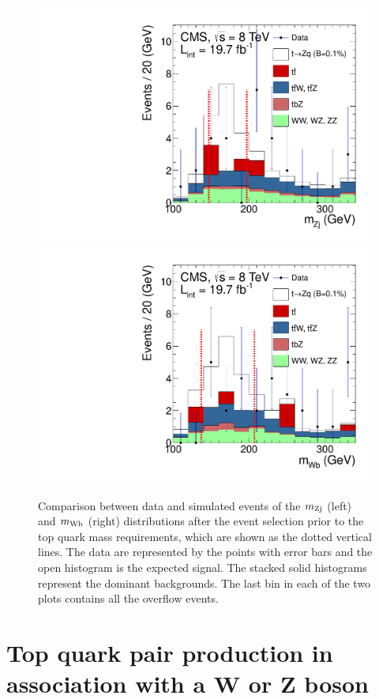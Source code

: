 \documentclass[a4paper]{PoS}
\begin{document}
\begin{figure}
\includegraphics[width=.45\textwidth]{figures/CMS-TOP-12-037_Figure_002-a}
\includegraphics[width=.45\textwidth]{figures/CMS-TOP-12-037_Figure_002-b}
\caption{Comparison between data and simulated events of the $m_{\rm Zj}$ (left)
and $m_{\rm Wb}$ (right) distributions after the event selection prior to the
top quark mass requirements, which are shown as the dotted vertical lines. The
data are represented by the points with error bars and the open histogram is the
expected signal. The stacked solid histograms represent the dominant backgrounds.
The last bin in each of the two plots contains all the overflow events.}
\label{fig:CMS-TOP-12-037}
\end{figure}


\section{Top quark pair production in association with a W or Z boson}
\end{document}
